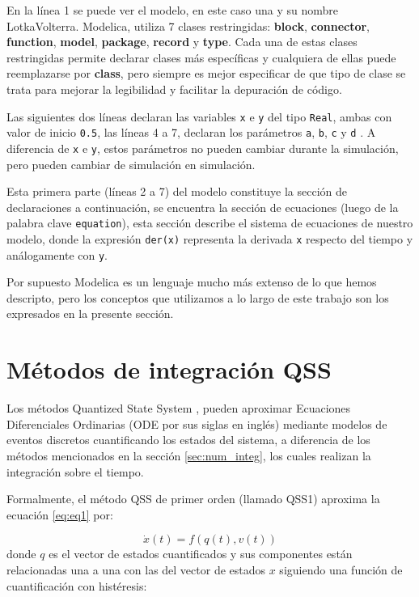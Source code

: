 	En la línea 1 se puede ver el modelo, en este caso una  y su nombre LotkaVolterra.
	Modelica, utiliza 7 clases restringidas:
	\textbf{block}, \textbf{connector}, \textbf{function}, \textbf{model}, \textbf{package}, \textbf{record} y \textbf{type}.
	Cada una de estas clases restringidas permite declarar clases más específicas y cualquiera de ellas puede reemplazarse
	por \textbf{class}, pero siempre es mejor especificar de que tipo de clase se trata para mejorar la legibilidad y facilitar la depuración de código.

	Las siguientes dos líneas declaran las variables \texttt{x} e \texttt{y} del tipo \texttt{Real}, ambas con valor de inicio \texttt{0.5}, las líneas 4 a 7, 
	declaran los parámetros \texttt{a}, \texttt{b}, \texttt{c} y \texttt{d} . A diferencia de \texttt{x} e \texttt{y}, estos parámetros no pueden cambiar durante la 
	simulación, pero pueden cambiar de simulación en simulación.

	Esta primera parte (líneas 2 a 7) del modelo constituye la sección de declaraciones a continuación, se encuentra la sección de ecuaciones 
	(luego de la palabra clave \texttt{equation}), esta sección describe el sistema de ecuaciones de nuestro modelo, donde la expresión \texttt{der(x)} 
	representa la derivada \texttt{x} respecto del tiempo y análogamente con \texttt{y}.
	
	Por supuesto Modelica es un lenguaje mucho más extenso de lo que hemos descripto, pero los conceptos que utilizamos a lo largo de este trabajo son los
	expresados en la presente sección.


\section{Métodos de integración QSS}
	Los métodos Quantized State System \cite{Fer12}\cite{Ber12}\cite{Beltrame06quantisedstate}\cite{Cel06}, pueden aproximar Ecuaciones 
	Diferenciales Ordinarias (ODE por sus siglas en inglés) mediante modelos de eventos discretos cuantificando los estados del sistema, 
	a diferencia de los métodos mencionados en la sección \ref{sec:num_integ}, los cuales realizan la integración sobre el tiempo. 

	Formalmente, el método QSS de primer orden (llamado QSS1) aproxima la ecuación \ref{eq:eq1} por:
	
	\begin{equation}
	\dot{x}(t) = f (q(t), v(t))
	\end{equation}
	donde $q$ es el vector de estados cuantificados y sus componentes están relacionadas una a una con las del vector de estados $x$ siguiendo una 
	función de cuantificación con histéresis:
	
